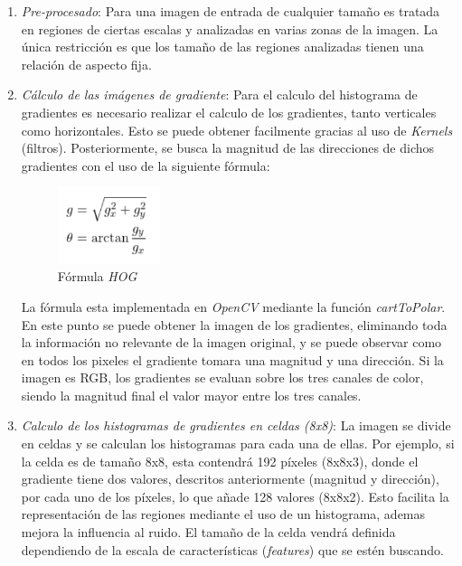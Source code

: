 \begin{enumerate}
	\item \textit{Pre-procesado}: Para una imagen de entrada de cualquier tamaño es tratada en regiones de ciertas escalas y analizadas en varias zonas de la imagen. La única restricción es que los tamaño de las regiones analizadas tienen una relación de aspecto fija.
	
	\item \textit{Cálculo de las imágenes de gradiente}: Para el calculo del histograma de gradientes es necesario realizar el calculo de los gradientes, tanto verticales como horizontales. Esto se puede obtener facilmente gracias al uso de \textit{Kernels} (filtros). Posteriormente, se busca la magnitud de las direcciones de dichos gradientes con el uso de la siguiente fórmula:
	
	\begin{figure}[htp]
		\centering
		\includegraphics[width=3cm]{imagenes/HOGFormula.png}
		\caption{Fórmula \textit{HOG}}
		\label{fig:hogf}
	\end{figure}
	
	La fórmula esta implementada en \textit{OpenCV} mediante la función \textit{cartToPolar}. En este punto se puede obtener la imagen de los gradientes, eliminando toda la información no relevante de la imagen original, y se puede observar como en todos los pixeles el gradiente tomara una magnitud y una dirección. Si la imagen es RGB, los gradientes se evaluan sobre los tres canales de color, siendo la magnitud final el valor mayor entre los tres canales.
	
	\item \textit{Calculo de los histogramas de gradientes en celdas (8x8)}: La imagen se divide en celdas y se calculan los histogramas para cada una de ellas. Por ejemplo, si la celda es de tamaño 8x8, esta contendrá 192 píxeles (8x8x3), donde el gradiente tiene dos valores, descritos anteriormente (magnitud y dirección), por cada uno de los píxeles, lo que añade 128 valores (8x8x2). Esto facilita la representación de las regiones mediante el uso de un histograma, ademas mejora la influencia al ruido. El tamaño de la celda vendrá definida dependiendo de la escala de características (\textit{features}) que se estén buscando.
	

\end{enumerate}
